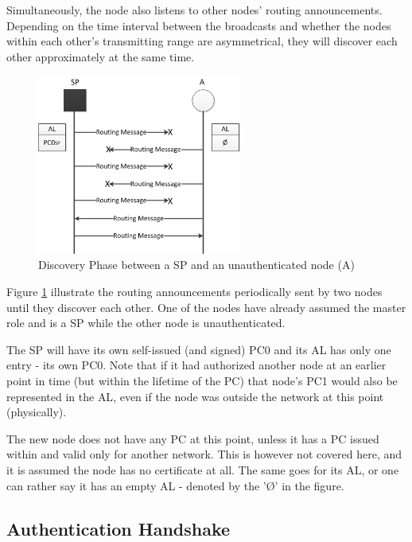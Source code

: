 Simultaneously, the node also listens to other nodes' routing announcements.
Depending on the time interval between the broadcasts and whether the nodes
within each other's transmitting range are asymmetrical, they will discover each
other approximately at the same time.

\begin{figure}[h]
	\centering
  	\includegraphics[width=0.6\textwidth]{images/node_states_discovery.png}
  	\caption{Discovery Phase between a \acf{SP} and an unauthenticated node (A)}
	\label{fig:node_states_discovery}
\end{figure}

Figure \ref{fig:node_states_discovery} illustrate the routing announcements
periodically sent by two nodes until they discover each other. One of the nodes
have already assumed the master role and is a \ac{SP} while the other node is
unauthenticated.

The \ac{SP} will have its own self-issued (and signed) \ac{PC0} and its \ac{AL}
has only one entry - its own \ac{PC0}. Note that if it had authorized another
node at an earlier point in time (but within the lifetime of the \ac{PC}) that
node's \ac{PC1} would also be represented in the \ac{AL}, even if the node was
outside the network at this point (physically).

The new node does not have any \ac{PC} at this point, unless it has a \ac{PC}
issued within and valid only for another network. This is however not covered
here, and it is assumed the node has no certificate at all. The same goes for
its \ac{AL}, or one can rather say it has an empty \ac{AL} - denoted by the
'\O' in the figure.

\subsection{Authentication Handshake}


